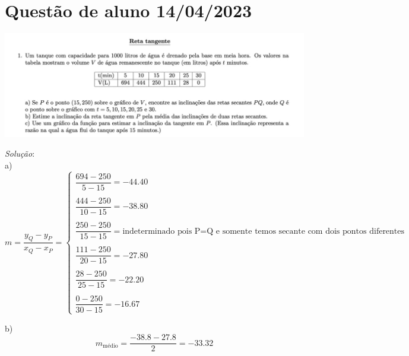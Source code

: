 \documentclass[brazilian, fleqn]{article}
\begin{document}
\section*{\centering Questão de aluno 14/04/2023}

\begin{center}
    \includegraphics[width=\textwidth]{quest-1.jpg}
\end{center}

\textit{Solução}:\\
a)
\[
    m=\frac{y_Q-y_P}{x_Q-x_P}=
    \begin{cases}
        \dfrac{694-250}{5-15}=\num{-44.40}\\ \\
        \dfrac{444-250}{10-15}=\num{-38.80}\\ \\
        \dfrac{250-250}{15-15}=\text{indeterminado pois P=Q e somente 
        temos secante com dois pontos diferentes} \\ \\
        \dfrac{111-250}{20-15}=\num{-27.80}\\ \\
        \dfrac{28-250}{25-15}=\num{-22.20}\\ \\
        \dfrac{0-250}{30-15}=\num{-16.67}
    \end{cases}
\]

b)
\[
    m_{\text{médio}} = \frac{\num{-38.8}-\num{27.8}}{2}=\num{-33.3}{2}
\]
\end{document}
